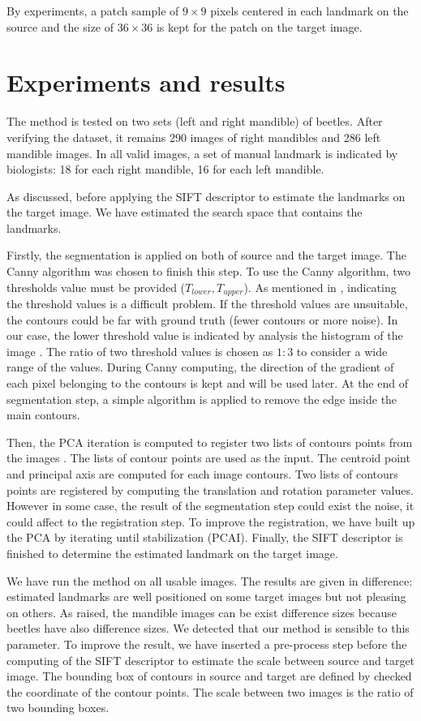 \documentclass{gretsi}
\begin{document}
By experiments, a patch sample of $9 \times 9$ pixels centered in each landmark on the source and the size of $36 \times 36$ is kept for the patch on the target image.
\section{Experiments and results}
The method is tested on two sets (left and right mandible) of beetles. After verifying the dataset, it remains 290 images of right mandibles and 286 left mandible images. In all valid images, a set of manual landmark is indicated by biologists: 18 for each right mandible, 16 for each left mandible.

As discussed, before applying the SIFT descriptor to estimate the landmarks on the target image. We have estimated the search space that contains the landmarks.

Firstly, the segmentation is applied on both of source and the target image. The Canny algorithm \cite{canny1986computational} was chosen to finish this step. To use the Canny algorithm, two thresholds value must be provided ($T_{lower}, T_{upper}$). As mentioned in \cite{adaptiveCanny}, indicating the threshold values is a difficult problem. If the threshold values are unsuitable, the contours could be far with ground truth (fewer contours or more noise). In our case, the lower threshold value is indicated by analysis the histogram of the image \cite{leestimating}. The ratio of two threshold values is chosen as $1 : 3$ to consider a wide range of the values. During Canny computing, the direction of the gradient of each pixel belonging to the contours is kept and will be used later. At the end of segmentation step, a simple algorithm is applied to remove the edge inside the main contours.

Then, the PCA iteration is computed to register two lists of contours points from the images \cite{shlens2014tutorial, jolliffe2002principal}. The lists of contour points are used  as the input. The centroid point and principal axis are computed for each image contours. Two lists of contours points are registered by computing the translation and rotation parameter values. However in some case, the result of the segmentation step could exist the noise, it could affect to the registration step. To improve the registration, we have built up the PCA by iterating until stabilization (PCAI). Finally, the SIFT descriptor is finished to determine the estimated landmark on the target image.

We have run the method on all usable images. The results are given in difference: estimated landmarks are well positioned on some target images but not pleasing on others. As raised, the mandible images can be exist difference sizes because beetles have also difference sizes. We detected that our method is sensible to this parameter. To improve the result, we have inserted a pre-process step before the computing of the SIFT descriptor to estimate the scale between source and target image. The bounding box of contours in source and target are defined by checked the coordinate of the contour points. The scale between two images is the ratio of two bounding boxes.
\end{document}
